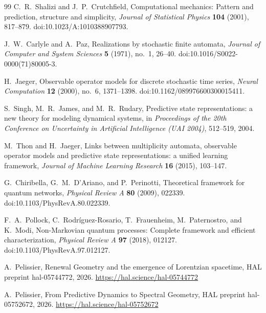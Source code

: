 \documentclass[11pt]{article}
\numberwithin{equation}{section}
\theoremstyle{definition}
\theoremstyle{remark}
\begin{document}
\begin{thebibliography}{99}
C.~R.~Shalizi and J.~P.~Crutchfield,
\newblock Computational mechanics: Pattern and prediction, structure and simplicity,
\newblock \emph{Journal of Statistical Physics} \textbf{104} (2001), 817--879.
\newblock doi:10.1023/A:1010388907793.

J.~W.~Carlyle and A.~Paz,
\newblock Realizations by stochastic finite automata,
\newblock \emph{Journal of Computer and System Sciences} \textbf{5} (1971),
no.~1, 26--40.
\newblock doi:10.1016/S0022-0000(71)80005-3.

H.~Jaeger,
\newblock Observable operator models for discrete stochastic time series,
\newblock \emph{Neural Computation} \textbf{12} (2000), no.~6, 1371--1398.
\newblock doi:10.1162/089976600300015411.

S.~Singh, M.~R.~James, and M.~R.~Rudary,
\newblock Predictive state representations: a new theory for modeling dynamical
systems,
\newblock in \emph{Proceedings of the 20th Conference on Uncertainty in
Artificial Intelligence (UAI 2004)}, 512--519, 2004.

M.~Thon and H.~Jaeger,
\newblock Links between multiplicity automata, observable operator models and
predictive state representations: a unified learning framework,
\newblock \emph{Journal of Machine Learning Research} \textbf{16} (2015),
103--147.

G.~Chiribella, G.~M.~D'Ariano, and P.~Perinotti,
\newblock Theoretical framework for quantum networks,
\newblock \emph{Physical Review A} \textbf{80} (2009), 022339.
\newblock doi:10.1103/PhysRevA.80.022339.

F.~A.~Pollock, C.~Rodr\'iguez-Rosario, T.~Frauenheim, M.~Paternostro, and K.~Modi,
\newblock Non-Markovian quantum processes: Complete framework and efficient characterization,
\newblock \emph{Physical Review A} \textbf{97} (2018), 012127.
\newblock doi:10.1103/PhysRevA.97.012127.

A.~Pelissier,
\newblock Renewal Geometry and the emergence of Lorentzian spacetime,
\newblock HAL preprint hal-05744772, 2026.
\newblock \url{https://hal.science/hal-05744772}

A.~Pelissier,
\newblock From Predictive Dynamics to Spectral Geometry,
\newblock HAL preprint hal-05752672, 2026.
\newblock \url{https://hal.science/hal-05752672}


\end{thebibliography}
\end{document}
